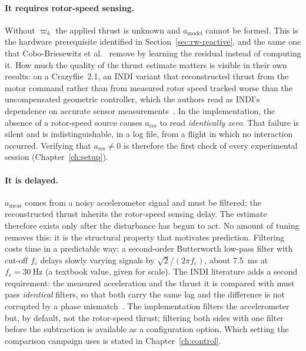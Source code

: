 \paragraph{It requires rotor-speed sensing.} Without $\varpi_k$ the applied thrust is unknown and
$a_{\mathrm{model}}$ cannot be formed. This is the hardware prerequisite identified in
Section~\ref{sec:rw-reactive}, and the same one that Cobo-Briesewitz et
al.~\cite{cobobriesewitz2026lindi} remove by learning the residual instead of computing it.
How much the quality of the thrust estimate matters is visible in their own results: on a
Crazyflie~2.1, an INDI variant that reconstructed thrust from the motor command rather than from
measured rotor speed tracked worse than the uncompensated geometric controller, which the authors
read as INDI's dependence on accurate sensor measurements~\cite{cobobriesewitz2026lindi}.
In the implementation, the absence of a rotor-speed source causes $a_{\mathrm{res}}$ to read
\emph{identically zero}. That failure is silent and is indistinguishable, in a log file, from a
flight in which no interaction occurred. Verifying that $a_{\mathrm{res}} \neq 0$ is therefore the
first check of every experimental session (Chapter~\ref{ch:setup}).

\paragraph{It is delayed.} $a_{\mathrm{meas}}$ comes from a noisy accelerometer signal
and must be filtered; the reconstructed thrust inherits the rotor-speed sensing delay. The estimate
therefore exists only after the disturbance has begun to act. No amount of tuning removes this: it
is the structural property that motivates prediction. Filtering costs time in a predictable way: a
second-order Butterworth low-pass filter with cut-off $f_c$ delays slowly varying signals by
$\sqrt{2}/(2\pi f_c)$, about \SI{7.5}{\milli\second} at $f_c = \SI{30}{\hertz}$ (a textbook value,
given for scale). The INDI literature adds a second requirement: the measured acceleration and the
thrust it is compared with must pass \emph{identical} filters, so that both carry the same lag and
the difference is not corrupted by a phase mismatch~\cite{tal2018indi,smeur2017cascadedindi}. The
implementation filters the accelerometer but, by default, not the rotor-speed thrust; filtering
both sides with one filter before the subtraction is available as a configuration option. Which
setting the comparison campaign uses is stated in Chapter~\ref{ch:control}.

